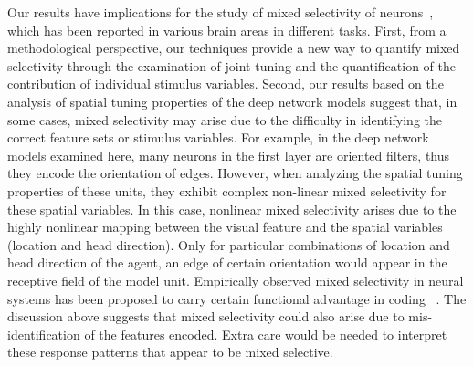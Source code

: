 \documentclass[11pt]{article}
\begin{document}
Our results have implications for the study of mixed selectivity of neurons~\cite{Rigotti2013}, which has been reported in various brain areas in different tasks. First, from a methodological perspective, our techniques provide a new way to quantify mixed selectivity through the examination of joint tuning and the quantification of the contribution of individual stimulus variables. Second, our results based on the analysis of spatial tuning properties of the deep network models suggest that, in some cases, mixed selectivity may arise due to the difficulty in identifying the correct feature sets or stimulus variables. For example, in the deep network models examined here, many neurons in the first layer are oriented filters, thus they encode the orientation of edges. 
However, when analyzing the spatial tuning properties of these units, they exhibit complex non-linear mixed selectivity for these spatial variables. In this case, nonlinear mixed selectivity arises due to the highly nonlinear mapping between the visual feature and the spatial variables (location and head direction). Only for particular combinations of location and head direction of the agent, an edge of certain orientation would appear in the receptive field of the model unit. Empirically observed mixed selectivity in neural systems has been proposed to carry certain functional advantage in coding ~\cite{Rigotti2013,Fusi2016neurons}. The discussion above suggests that mixed selectivity could also arise due to mis-identification of the features encoded. Extra care would be needed to interpret these response patterns that appear to be mixed selective. 


\end{document}
